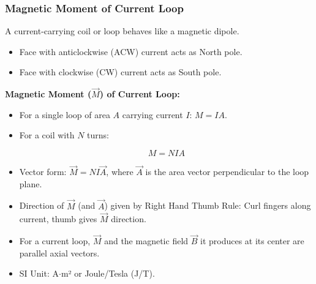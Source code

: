 \transfade[duration=0.5]

\begin{frame}[t]
    \frametitle{\textcolor{deepnavy}{\textbf{Magnetic Moment of Current Loop}}}
    \renewcommand{\familydefault}{\rmdefault}
    \small

      \item<+-> A current-carrying coil or loop behaves like a magnetic dipole.
        \begin{itemize}[<+->]
              \item Face with anticlockwise (ACW) current acts as North pole.
              \item Face with clockwise (CW) current acts as South pole. %
        \end{itemize}

      \item<+-> \textbf{Magnetic Moment ($\vec{M}$) of Current Loop:}
        \begin{itemize}[<+->]
              \item For a single loop of area $A$ carrying current $I$: $M = IA$.
            \item For a coil with $N$ turns:
            \begin{tcolorbox}[colback=blue!5,colframe=blue!80,boxrule=0.5pt,arc=1mm,boxsep=1pt]
            \begin{equation*}
                 M = NIA
            \end{equation*}
              \end{tcolorbox}
              \item Vector form: $\vec{M} = NI\vec{A}$, where $\vec{A}$ is the area vector perpendicular to the loop plane.
              \item Direction of $\vec{M}$ (and $\vec{A}$) given by Right Hand Thumb Rule: Curl fingers along current, thumb gives $\vec{M}$ direction.
              \item For a current loop, $\vec{M}$ and the magnetic field $\vec{B}$ it produces at its center are parallel axial vectors.
              \item SI Unit: A$\cdot$m² or Joule/Tesla (J/T).
        \end{itemize}
\end{frame}

